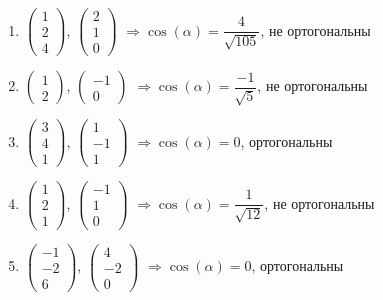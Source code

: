 \documentclass[11pt, a4paper]{extarticle}
\begin{document}
		\begin{enumerate}[label=\alph*)]
			\item $\begin{pmatrix}
			1 \\
			2 \\
			4
			\end{pmatrix}$, $\begin{pmatrix}
			2 \\
			1 \\
			0
			\end{pmatrix}$ $\Rightarrow \cos(\alpha) = \dfrac{4}{\sqrt{105}}$, не ортогональны
			\item $\begin{pmatrix}
			1 \\
			2
			\end{pmatrix}$, $\begin{pmatrix}
			-1 \\
			0
			\end{pmatrix}$ $\Rightarrow \cos(\alpha) = \dfrac{-1}{\sqrt{5}}$, не ортогональны
			\item $\begin{pmatrix}
			3 \\
			4 \\
			1
			\end{pmatrix}$, $\begin{pmatrix}
			1 \\
			-1 \\
			1
			\end{pmatrix}$ $\Rightarrow \cos(\alpha) = 0$, ортогональны
			\item $\begin{pmatrix}
			1 \\
			2 \\
			1
			\end{pmatrix}$, $\begin{pmatrix}
			-1 \\
			1 \\
			0
			\end{pmatrix}$ $\Rightarrow \cos(\alpha) = \dfrac{1}{\sqrt{12}}$, не ортогональны
			\item $\begin{pmatrix}
			-1 \\
			-2 \\
			6
			\end{pmatrix}$, $\begin{pmatrix}
			4 \\
			-2 \\
			0
			\end{pmatrix}$ $\Rightarrow \cos(\alpha) = 0$, ортогональны

\end{enumerate}
\end{document}
